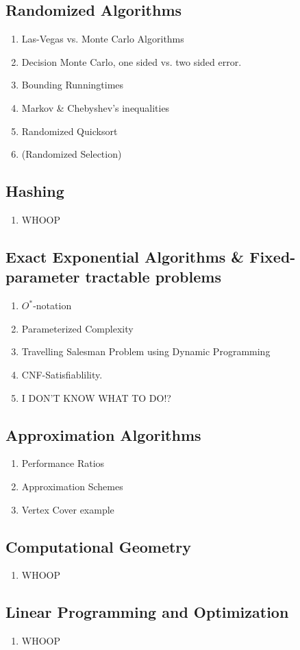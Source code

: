 \subsection{Randomized Algorithms}
\begin{enumerate}
  \item Las-Vegas vs. Monte Carlo Algorithms
  \item Decision Monte Carlo, one sided vs. two sided error.
  \item Bounding Runningtimes
  \item Markov \& Chebyshev's inequalities
  \item Randomized Quicksort
  \item (Randomized Selection)
\end{enumerate}
\newpage

\subsection{Hashing}
\begin{enumerate}
  \item WHOOP
\end{enumerate}
\newpage

\subsection{Exact Exponential Algorithms \& Fixed-parameter tractable problems}
\begin{enumerate}
  \item $O^*$-notation
  \item Parameterized Complexity
  \item Travelling Salesman Problem using Dynamic Programming
  \item CNF-Satisfiablility.
  \item I DON'T KNOW WHAT TO DO!?
\end{enumerate}
\newpage

\subsection{Approximation Algorithms}
\begin{enumerate}
  \item Performance Ratios
  \item Approximation Schemes
  \item Vertex Cover example
\end{enumerate}
\newpage

\subsection{Computational Geometry}
\begin{enumerate}
  \item WHOOP
\end{enumerate}
\newpage

\subsection{Linear Programming and Optimization}
\begin{enumerate}
  \item WHOOP
\end{enumerate}
\newpage